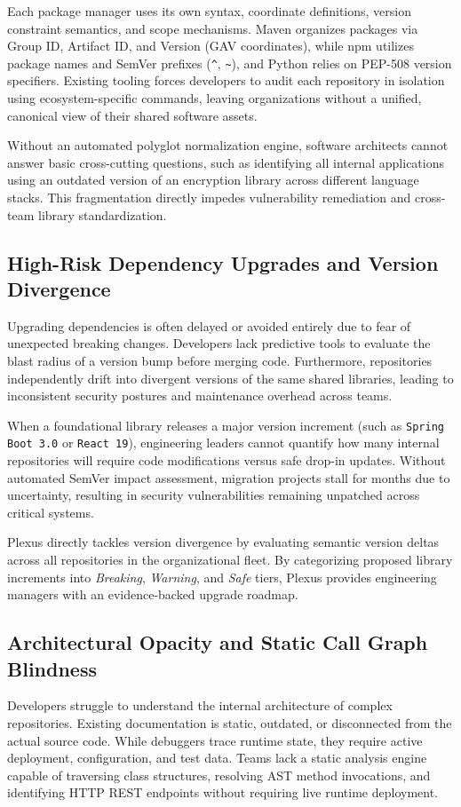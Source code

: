 \documentclass[11pt,a4paper,openany]{report}
\begin{document}
Each package manager uses its own syntax, coordinate definitions, version constraint semantics, and scope mechanisms. Maven organizes packages via Group ID, Artifact ID, and Version (GAV coordinates), while npm utilizes package names and SemVer prefixes (\texttt{\^{}}, \texttt{\~{}}), and Python relies on PEP-508 version specifiers. Existing tooling forces developers to audit each repository in isolation using ecosystem-specific commands, leaving organizations without a unified, canonical view of their shared software assets.

Without an automated polyglot normalization engine, software architects cannot answer basic cross-cutting questions, such as identifying all internal applications using an outdated version of an encryption library across different language stacks. This fragmentation directly impedes vulnerability remediation and cross-team library standardization.

\subsection{High-Risk Dependency Upgrades and Version Divergence}
Upgrading dependencies is often delayed or avoided entirely due to fear of unexpected breaking changes. Developers lack predictive tools to evaluate the blast radius of a version bump before merging code. Furthermore, repositories independently drift into divergent versions of the same shared libraries, leading to inconsistent security postures and maintenance overhead across teams.

When a foundational library releases a major version increment (such as \texttt{Spring Boot 3.0} or \texttt{React 19}), engineering leaders cannot quantify how many internal repositories will require code modifications versus safe drop-in updates. Without automated SemVer impact assessment, migration projects stall for months due to uncertainty, resulting in security vulnerabilities remaining unpatched across critical systems.

Plexus directly tackles version divergence by evaluating semantic version deltas across all repositories in the organizational fleet. By categorizing proposed library increments into \textit{Breaking}, \textit{Warning}, and \textit{Safe} tiers, Plexus provides engineering managers with an evidence-backed upgrade roadmap.

\subsection{Architectural Opacity and Static Call Graph Blindness}
Developers struggle to understand the internal architecture of complex repositories. Existing documentation is static, outdated, or disconnected from the actual source code. While debuggers trace runtime state, they require active deployment, configuration, and test data. Teams lack a static analysis engine capable of traversing class structures, resolving AST method invocations, and identifying HTTP REST endpoints without requiring live runtime deployment.
\end{document}
